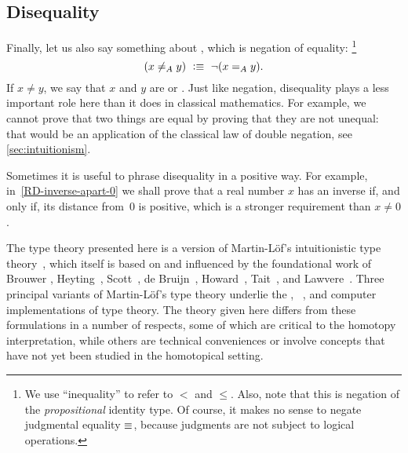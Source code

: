 \subsection{Disequality}
\label{sec:disequality}

Finally, let us also say something about ,
%
which is negation of equality:%
\footnote{We use ``inequality''
  to refer to $<$ and $\leq$. Also, note that this is negation of the \emph{propositional} identity type.
Of course, it makes no sense to negate judgmental equality $\jdeq$, because judgments are not subject to logical operations.}
%
\begin{equation*}
  (x \neq_A y) \ \defeq\ \lnot (\id[A]{x}{y}).
\end{equation*}
If $x\neq y$, we say that $x$ and $y$ are 
%
or .
%
Just like negation, disequality plays a less important role here than it does in classical
mathematics. For example, we cannot prove that two things are equal by proving that they
are not unequal: that would be an application of the classical law of double negation, see \cref{sec:intuitionism}.

Sometimes it is useful to phrase disequality in a positive way. For example,
in~\cref{RD-inverse-apart-0} we shall prove that a real number $x$ has an inverse if,
and only if, its distance from~$0$ is positive, which is a stronger requirement than $x
\neq 0$.

%

\sectionNotes

The type theory presented here is a version of Martin-L\"{o}f's intuitionistic type 
theory~\cite{Martin-Lof-1972,Martin-Lof-1973,Martin-Lof-1979,martin-lof:bibliopolis}, which itself is based on and influenced 
by the foundational work of Brouwer \cite{beeson}, Heyting~\cite{heyting1966intuitionism}, Scott~\cite{scott70}, de 
Bruijn~\cite{deBruijn-1973}, Howard~\cite{howard:pat}, Tait~\cite{Tait-1966,Tait-1968}, and Lawvere~\cite{lawvere:adjinfound}.
%
Three principal variants of Martin-L\"{o}f's type theory underlie the \NuPRL \cite{constable+86nuprl-book}, \Coq~\cite{Coq}, and 
\Agda \cite{norell2007towards} computer implementations of type theory.  The theory given here differs from these formulations in a number 
of respects, some of which are critical to the homotopy interpretation, while others are technical conveniences or involve concepts that 
have not yet been studied in the homotopical setting.

